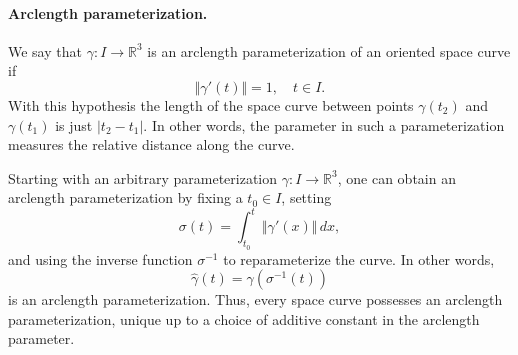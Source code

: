 \documentclass[12pt]{article}
\newcommand{\reals}{\mathbb{R}}
\begin{document}
\paragraph{Arclength parameterization.}
We say that $\gamma:I\to\reals^3$ is an arclength parameterization of an
oriented space curve if 
$$\Vert \gamma'(t) \Vert = 1,\quad t\in I.$$
With this hypothesis the
length of the space curve between points $\gamma(t_2)$ and $\gamma(t_1)$ is
just $\vert t_2-t_1 \vert$.  In other words, the parameter in such a
parameterization measures the relative distance along the
curve. 

Starting with an arbitrary parameterization $\gamma: I\to \reals^3$,
one can obtain an arclength parameterization by fixing a $t_0\in I$,
setting
$$\sigma(t) = \int^t_{t_0} \Vert \gamma'(x)\Vert \, dx,$$
and using the
inverse function $\sigma^{-1}$ to reparameterize the curve.  In other
words,
$$\hat{\gamma}(t) = \gamma(\sigma^{-1}(t))$$
is an arclength
parameterization.  Thus, every space curve possesses an arclength
parameterization, unique up to a choice of additive constant in the
arclength parameter.
\end{document}
